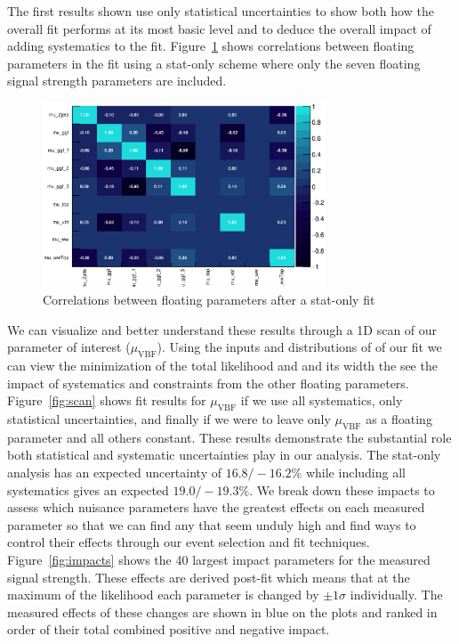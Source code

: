 The first results shown use only statistical uncertainties to show both how the overall fit performs at its most basic level and to deduce the overall impact of adding systematics to the fit. Figure~\ref{fig:correlations} shows correlations between floating parameters in the fit using a stat-only scheme where only the seven floating signal strength parameters are included.

\begin{figure}[!h]
\centering
\includegraphics[width=0.75\textwidth]{Pictures/fitresults/correlation_stat.eps}
\caption{Correlations between floating parameters after a stat-only fit}
\label{fig:correlations}
\end{figure}

We can visualize and better understand these results through a 1D scan of our parameter of interest ($\mu_{\text{VBF}}$). Using the inputs and distributions of of our fit we can view the minimization of the total likelihood and and its width the see the impact of systematics and constraints from the other floating parameters. Figure~\ref{fig:scan} shows fit results for $\mu_{\text{VBF}}$ if we use all systematics, only statistical uncertainties, and finally if we were to leave only $\mu_{\text{VBF}}$ as a floating parameter and all others constant. These results demonstrate the substantial role both statistical and systematic uncertainties play in our analysis. The stat-only analysis has an expected uncertainty of $16.8/-16.2\%$ while including all systematics gives an expected $19.0/-19.3\%$. We break down these impacts to assess which nuisance parameters have the greatest effects on each measured parameter so that we can find any that seem unduly high and find ways to control their effects through our event selection and fit techniques. Figure~\ref{fig:impacts} shows the 40 largest impact parameters for the measured signal strength. These effects are derived post-fit which means that at the maximum of the likelihood each parameter is changed by $\pm 1\sigma$ individually. The measured effects of these changes are shown in blue on the plots and ranked in order of their total combined positive and negative impact. 

